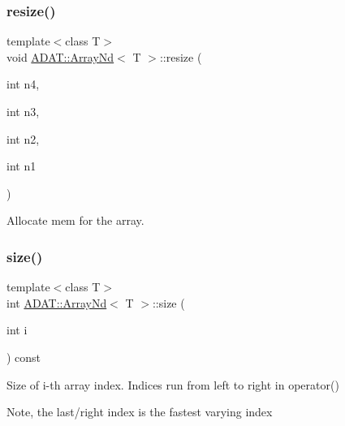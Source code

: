 \subsubsection{\texorpdfstring{resize()}{resize()}\hspace{0.1cm}{\footnotesize\ttfamily [15/15]}}
{\footnotesize\ttfamily template$<$class T$>$ \\
void \mbox{\hyperlink{classADAT_1_1ArrayNd}{A\+D\+A\+T\+::\+Array\+Nd}}$<$ T $>$\+::resize (\begin{DoxyParamCaption}\item[{int}]{n4,  }\item[{int}]{n3,  }\item[{int}]{n2,  }\item[{int}]{n1 }\end{DoxyParamCaption})\hspace{0.3cm}{\ttfamily [inline]}}



Allocate mem for the array. 

\mbox{\label{classADAT_1_1ArrayNd_aa289b2d57b41dc1c61d061865e6cb912}} 
\subsubsection{\texorpdfstring{size()}{size()}\hspace{0.1cm}{\footnotesize\ttfamily [1/6]}}
{\footnotesize\ttfamily template$<$class T$>$ \\
int \mbox{\hyperlink{classADAT_1_1ArrayNd}{A\+D\+A\+T\+::\+Array\+Nd}}$<$ T $>$\+::size (\begin{DoxyParamCaption}\item[{int}]{i }\end{DoxyParamCaption}) const\hspace{0.3cm}{\ttfamily [inline]}}



Size of i-\/th array index. Indices run from left to right in operator() 

Note, the last/right index is the fastest varying index \mbox{\label{classADAT_1_1ArrayNd_aa289b2d57b41dc1c61d061865e6cb912}} 
